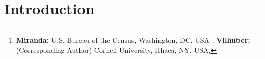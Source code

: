 \documentclass[letter,11pt]{llncs}
\newcommand{\keywords}[1]{\par\addvspace\baselineskip
\noindent\keywordname\enspace\ignorespaces#1}
\begin{document}
\mainmatter  %

\title{\mytitle}

\titlerunning{\myshorttitle}

%
%
\author{Javier Miranda \and Lars Vilhuber \thanks{\textbf{Miranda:} U.S. Bureau of the Census, Washington, DC, USA . \textbf{Vilhuber:} (Corresponding Author) Cornell University, Ithaca, NY, USA, }}
%

\institute{}
%
%

\maketitle


\begin{abstract}

\keywords{synthetic data, statistical disclosure limitation, time-series, local labor markets, gross 
job flows, confidentiality protection}
\end{abstract}

\clearpage
\section{Introduction}
\label{sec:intro}

\end{document}
